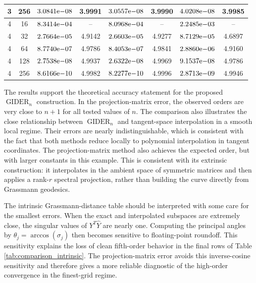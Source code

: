 \documentclass[a4paper,11pt]{article}
\newcommand{\GIDER}{\operatorname{GIDER}}
\numberwithin{equation}{section}
\theoremstyle{plain}
\theoremstyle{definition}
\theoremstyle{remark}
\begin{document}
\begin{table}[t]
{\begin{tabular}{cc|cc|cc|cc}
3 & 256 & \(3.0841{\rm e}{-08}\) & 3.9991 & \(3.0557{\rm e}{-08}\) & 3.9990 & \(4.0208{\rm e}{-08}\) & 3.9985 \\
\midrule
4 & 16  & \(8.3414{\rm e}{-04}\) & --     & \(8.0968{\rm e}{-04}\) & --     & \(2.2485{\rm e}{-03}\) & --     \\
4 & 32  & \(2.7664{\rm e}{-05}\) & 4.9142 & \(2.6603{\rm e}{-05}\) & 4.9277 & \(8.7129{\rm e}{-05}\) & 4.6897 \\
4 & 64  & \(8.7740{\rm e}{-07}\) & 4.9786 & \(8.4053{\rm e}{-07}\) & 4.9841 & \(2.8860{\rm e}{-06}\) & 4.9160 \\
4 & 128 & \(2.7538{\rm e}{-08}\) & 4.9937 & \(2.6322{\rm e}{-08}\) & 4.9969 & \(9.1537{\rm e}{-08}\) & 4.9786 \\
4 & 256 & \(8.6166{\rm e}{-10}\) & 4.9982 & \(8.2277{\rm e}{-10}\) & 4.9996 & \(2.8713{\rm e}{-09}\) & 4.9946 \\
\bottomrule
\end{tabular}
}
\end{table}

The results support the theoretical accuracy statement for the proposed \(\GIDER_n\) construction.  In the projection-matrix error, the observed orders are very close to \(n+1\) for all tested values of \(n\).  The comparison also illustrates the close relationship between \(\GIDER_n\) and tangent-space interpolation in a smooth local regime.  Their errors are nearly indistinguishable, which is consistent with the fact that both methods reduce locally to polynomial interpolation in tangent coordinates.  The projection-matrix method also achieves the expected order, but with larger constants in this example.  This is consistent with its extrinsic construction: it interpolates in the ambient space of symmetric matrices and then applies a rank-\(r\) spectral projection, rather than building the curve directly from Grassmann geodesics.

The intrinsic Grassmann-distance table should be interpreted with some care for the smallest errors.  When the exact and interpolated subspaces are extremely close, the singular values of \(Y^T\widehat Y\) are nearly one.  Computing the principal angles by \(\theta_j=\arccos(\sigma_j)\) then becomes sensitive to floating-point roundoff.  This sensitivity explains the loss of clean fifth-order behavior in the final rows of Table \ref{tab:comparison_intrinsic}.  The projection-matrix error avoids this inverse-cosine sensitivity and therefore gives a more reliable diagnostic of the high-order convergence in the finest-grid regime.
\end{document}
